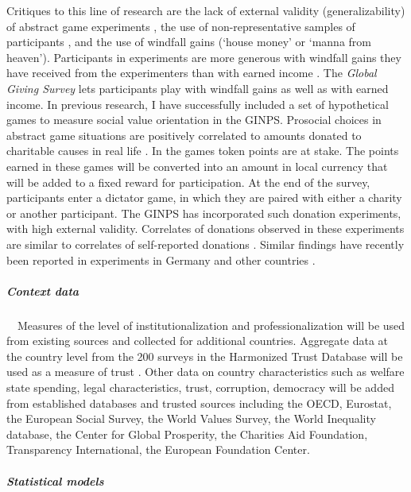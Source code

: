 \documentclass[twocolumn, serif, rga, numeric]{jote-article}
\begin{document}
Critiques to this line of research are the lack of external validity (generalizability) of abstract game experiments \cite{Levitt2007, Levitt2009, List2008}, the use of non-representative samples of participants \cite{Henrich2010}, and the use of windfall gains (`house money' or `manna from heaven')\cite{Hertwig2001}.
Participants in experiments are more generous with windfall gains they have received from the experimenters than with earned income \cite{Carlsson2013, Erkal2011, Cherry2002}. The \emph{Global Giving Survey}
lets participants play with windfall gains as well as with earned income. In previous research, I have successfully included a set of hypothetical games to measure social value orientation in the GINPS.
Prosocial choices in abstract game situations are positively correlated to amounts donated to charitable causes in real life \cite{VanLange2007}. In the games token points are at stake.
The points earned in these games will be converted into an amount in local currency that will be added to a fixed reward for participation.
At the end of the survey, participants enter a dictator game, in which they are paired with either a charity or another participant. The GINPS has incorporated such donation experiments, with high external validity.
Correlates of donations observed in these experiments are similar to correlates of self-reported donations \cite{Bekkers2007a}.
Similar findings have recently been reported in experiments in Germany and other countries \cite{Falk2015, Kistler2017}.

\subparagraph{Context data}

\ \ Measures of the level of institutionalization and professionalization will be used from existing sources \cite{Wiepking2015} and collected for additional countries. Aggregate data at the country level from the 200 surveys in the Harmonized Trust Database will be used as a measure of trust \cite{Wilhelm2006}. Other data on country characteristics such as welfare state spending, legal characteristics, trust, corruption, democracy will be added from established databases and trusted sources including the OECD, Eurostat, the European Social Survey, the World Values Survey, the World Inequality database, the Center for Global Prosperity, the Charities Aid Foundation, Transparency International, the European Foundation Center.

\subparagraph{Statistical models}
\end{document}
